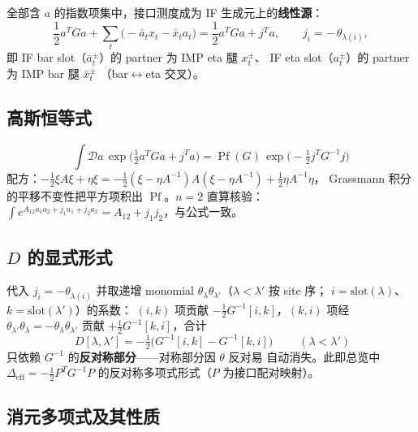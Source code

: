 \documentclass[11pt,a4paper]{ctexart}
\newcommand{\ab}{\bar a}          %
\newcommand{\xb}{\bar x}          %
\newcommand{\Pf}{\operatorname{Pf}}
\newcommand{\Deff}{D}             %
\begin{document}
全部含 $a$ 的指数项集中，接口测度成为 IF 生成元上的\textbf{线性源}：
\begin{equation}
\frac12 a^{T}Ga+\sum_t\big(-\ab_t x_t-\xb_t a_t\big)
 =\frac12 a^{T}Ga+j^{T}a,
\qquad
j_i=-\,\theta_{\lambda(i)} ,
\end{equation}
即 IF bar slot（$\ab_t^{\pm}$）的 partner 为 IMP eta 腿 $x_t^{\pm}$、
IF eta slot（$a_t^{\pm}$）的 partner 为 IMP bar 腿 $\xb_t^{\pm}$
（bar$\leftrightarrow$eta 交叉）。

\subsection{高斯恒等式}

\begin{equation}
\boxed{\;\int \mathcal D a\,
\exp\!\Big(\tfrac12 a^{T}Ga+j^{T}a\Big)
=\Pf(G)\,\exp\!\Big(-\tfrac12 j^{T}G^{-1}j\Big)\;}
\label{eq:gauss}
\end{equation}
配方：$-\tfrac12\xi A\xi+\eta\xi
=-\tfrac12(\xi-\eta A^{-1})A(\xi-\eta A^{-1})+\tfrac12\eta A^{-1}\eta$，
Grassmann 积分的平移不变性把平方项积出 $\Pf$。$n{=}2$ 直算核验：
$\int e^{A_{12}a_1a_2+j_1a_1+j_2a_2}=A_{12}+j_1j_2$，与公式一致。

\subsection{$\Deff$ 的显式形式}

代入 $j_i=-\theta_{\lambda(i)}$ 并取递增 monomial
$\theta_\lambda\theta_{\lambda'}$（$\lambda<\lambda'$ 按 site 序；
$i=\mathrm{slot}(\lambda)$、$k=\mathrm{slot}(\lambda')$）的系数：
$(i,k)$ 项贡献 $-\tfrac12G^{-1}[i,k]$，$(k,i)$ 项经
$\theta_{\lambda'}\theta_\lambda=-\theta_\lambda\theta_{\lambda'}$
贡献 $+\tfrac12G^{-1}[k,i]$，合计
\begin{equation}
\boxed{\;\Deff[\lambda,\lambda']
 =-\tfrac12\big(G^{-1}[i,k]-G^{-1}[k,i]\big)\;}
\qquad(\lambda<\lambda')
\label{eq:Deff}
\end{equation}
只依赖 $G^{-1}$ 的\textbf{反对称部分}——对称部分因 $\theta$ 反对易
自动消失。此即总览中 $\Delta_{\mathrm{eff}}=-\tfrac12P^{T}G^{-1}P$
的反对称多项式形式（$P$ 为接口配对映射）。

\subsection{消元多项式及其性质}
\end{document}
